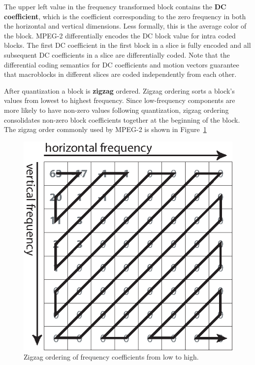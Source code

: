The upper left value in the frequency transformed block contains the
\textbf{DC coefficient}, which
is the coefficient corresponding to the zero frequency
in both the horizontal and vertical dimensions. Less formally,
this is the average color of the block. 
MPEG-2 differentially encodes the DC block value for 
intra coded blocks. 
The first DC coefficient in the first block in a slice is fully
encoded and all subsequent DC coefficients in a slice are 
differentially coded. Note that the differential coding
semantics for DC coefficients and motion vectors guarantee that
macroblocks in different slices are coded
independently from each other.

After quantization a block is \textbf{zigzag} ordered. 
Zigzag ordering sorts a
block's values from lowest to highest frequency. Since
low-frequency components are more likely to have non-zero 
values following quantization, zigzag ordering consolidates 
non-zero block coefficients together at the beginning of the block. 
The zigzag order commonly used by MPEG-2 is shown in Figure~\ref{fig:zigzag_order}

\begin{figure}
  \begin{center}
    \includegraphics[scale=0.6, angle=0]{./zigzag_order.eps}
    \caption{Zigzag ordering of frequency coefficients from low to high.}
    \label{fig:zigzag_order}
  \end{center}
\end{figure}

